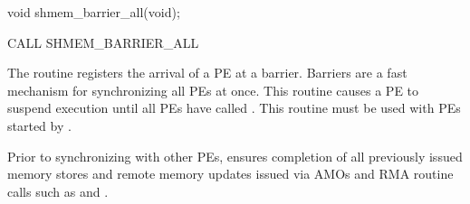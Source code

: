 \synC   %

void shmem_barrier_all(void);%

\synF   %

CALL SHMEM_BARRIER_ALL%

{   
    The  routine registers the arrival of a \ac{PE} at a
    barrier. Barriers are a fast mechanism for synchronizing all \ac{PE}s at
    once.  This routine causes a \ac{PE} to suspend execution until all \ac{PE}s have
    called .  This routine must be used with \ac{PE}s started
    by .

    Prior to synchronizing with other \ac{PE}s,  ensures
    completion of all previously issued memory stores and remote
    memory updates issued via \openshmem{} \acp{AMO} and \ac{RMA} routine calls  such as  and .
}
{
}
\eAPI 
%
% 
% 
% 
% 
% 
% 
% 
% 
% 
% 
% 
% 
% 
% 
%        
